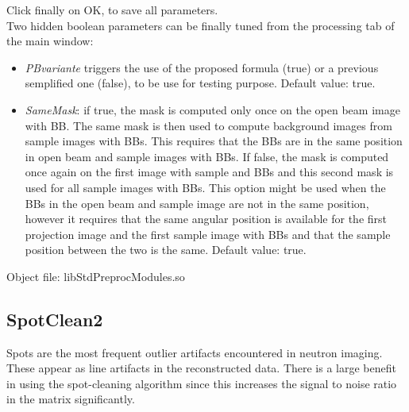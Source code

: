 \documentclass[a4paper]{scrreprt}
\begin{document}
Click finally on OK, to save all parameters. \\
Two hidden boolean parameters can be finally tuned from the processing tab of the main window:
\begin{itemize}
\item \textit{PBvariante} triggers the use of the proposed formula (true) or a previous semplified one (false), to be use for testing purpose. Default value: true.
\item \textit{SameMask}: if true, the mask is computed only once on the open beam image with BB. The same mask is then used to compute background images from sample images with BBs. This requires that the BBs are in the same position in open beam and sample images with BBs. If false, the mask is computed once again on the first image with sample and BBs and this second mask is used for all sample images with BBs. This option might be used when the BBs in the open beam and sample image are not in the same position, however it requires that the same angular position is available for the first projection image and the first sample image with BBs and that the sample position between the two is the same. Default value: true.   
\end{itemize}


  
Object file: libStdPreprocModules.so


\subsection{SpotClean2}
Spots are the most frequent outlier artifacts encountered in neutron imaging. These appear as line artifacts in the reconstructed data. There is a large benefit in using the spot-cleaning algorithm since this increases the signal to
noise ratio in the matrix significantly.
\end{document}
